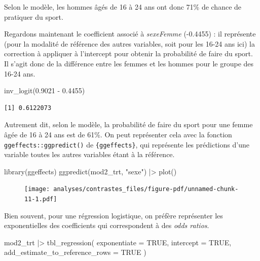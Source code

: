 \documentclass[
  letterpaper,
  DIV=11,
  numbers=noendperiod,
  oneside]{scrreprt}
\newenvironment{Shaded}{\begin{snugshade}}{\end{snugshade}}
\newcommand{\AttributeTok}[1]{\textcolor[rgb]{0.40,0.45,0.13}{#1}}
\newcommand{\ConstantTok}[1]{\textcolor[rgb]{0.56,0.35,0.01}{#1}}
\newcommand{\FloatTok}[1]{\textcolor[rgb]{0.68,0.00,0.00}{#1}}
\newcommand{\FunctionTok}[1]{\textcolor[rgb]{0.28,0.35,0.67}{#1}}
\newcommand{\NormalTok}[1]{\textcolor[rgb]{0.00,0.23,0.31}{#1}}
\newcommand{\SpecialCharTok}[1]{\textcolor[rgb]{0.37,0.37,0.37}{#1}}
\newcommand{\StringTok}[1]{\textcolor[rgb]{0.13,0.47,0.30}{#1}}
\begin{document}
Selon le modèle, les hommes âgés de 16 à 24 ans ont donc 71\% de chance
de pratiquer du sport.

Regardons maintenant le coefficient associé à \emph{sexeFemme} (-0.4455)
: il représente (pour la modalité de référence des autres variables,
soit pour les 16-24 ans ici) la correction à appliquer à l'intercept
pour obtenir la probabilité de faire du sport. Il s'agit donc de la
différence entre les femmes et les hommes pour le groupe des 16-24 ans.

\begin{Shaded}
\begin{Highlighting}[]
\FunctionTok{inv\_logit}\NormalTok{(}\FloatTok{0.9021} \SpecialCharTok{{-}} \FloatTok{0.4455}\NormalTok{)}
\end{Highlighting}
\end{Shaded}

\begin{verbatim}
[1] 0.6122073
\end{verbatim}

Autrement dit, selon le modèle, la probabilité de faire du sport pour
une femme âgée de 16 à 24 ans est de 61\%. On peut représenter cela avec
la fonction \texttt{ggeffects::ggpredict()} de \texttt{\{ggeffects\}},
qui représente les prédictions d'une variable toutes les autres
variables étant à la référence.

\begin{Shaded}
\begin{Highlighting}[]
\FunctionTok{library}\NormalTok{(ggeffects)}
\FunctionTok{ggpredict}\NormalTok{(mod2\_trt, }\StringTok{"sexe"}\NormalTok{) }\SpecialCharTok{|\textgreater{}} \FunctionTok{plot}\NormalTok{()}
\end{Highlighting}
\end{Shaded}

\begin{figure}[H]

{\centering \texttt{[image: analyses/contrastes\_files/figure-pdf/unnamed-chunk-11-1.pdf]}

}

\end{figure}

Bien souvent, pour une régression logistique, on préfère représenter les
exponentielles des coefficients qui correspondent à des \emph{odds
ratios}.

\begin{Shaded}
\begin{Highlighting}[]
\NormalTok{mod2\_trt }\SpecialCharTok{|\textgreater{}}
  \FunctionTok{tbl\_regression}\NormalTok{(}
    \AttributeTok{exponentiate =} \ConstantTok{TRUE}\NormalTok{,}
    \AttributeTok{intercept =} \ConstantTok{TRUE}\NormalTok{, }
    \AttributeTok{add\_estimate\_to\_reference\_rows =} \ConstantTok{TRUE}
\NormalTok{  )}
\end{Highlighting}
\end{Shaded}
\end{document}
